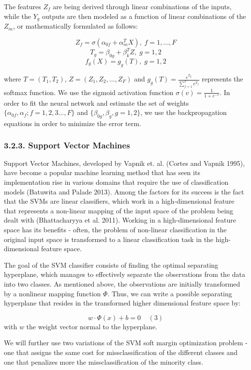 \documentclass[12pt,]{article}
\begin{document}
The features \(Z_f\) are being derived through linear combinations of
the inputs, while the \(Y_g\) outputs are then modeled as a function of
linear combinations of the \(Z_m\), or mathematically formulated as
follows:

\[Z_f=\sigma(\alpha_{0f}+\alpha_{m}^{T}X),\;f=1,...,F\]
\[T_g=\beta_{0g}+\beta_{k}^{T}Z,\;g=1,2\] \[f_{g}(X)=g_g(T),\;g=1,2\]

where \(T=(T_1,T_2)\), \(Z=(Z_1,Z_2,...,Z_F)\) and
\(g_g(T)=\frac{e^{T_g}}{\sum_{f=1}^{F}e^{T_f}}\) represents the softmax
function. We use the sigmoid activation function
\(\sigma(v)=\frac{1}{1+e^{-v}}\). In order to fit the neural network and
estimate the set of weights \(\{\alpha_{0f},\alpha_{f};f=1,2,3...,F\}\)
and \(\{\beta_{0g},\beta_{g},g=1,2\}\), we use the backpropagation
equations in order to minimize the error term.

\hypertarget{support-vector-machines}{%
\subsubsection{3.2.3. Support Vector
Machines}\label{support-vector-machines}}

Support Vector Machines, developed by Vapnik et. al. (Cortes and Vapnik
1995), have become a popular machine learning method that has seen its
implementation rise in various domains that require the use of
classification models (Batuwita and Palade 2013). Among the factors for
its success is the fact that the SVMs are linear classifiers, which work
in a high-dimensional feature that represents a non-linear mapping of
the input space of the problem being dealt with (Bhattacharyya et al.
2011). Working in a high-dimensional feature space has its benefits -
often, the problem of non-linear classification in the original input
space is transformed to a linear classification task in the
high-dimensional feature space.

The goal of the SVM classifier consists of finding the optimal
separating hyperplane, which manages to effectively separate the
observations from the data into two classes. As mentioned above, the
observations are initially transformed by a nonlinear mapping function
\(\Phi\). Thus, we can write a possible separating hyperplane that
resides in the transformed higher dimensional feature space by:

\[w\cdot\Phi(x)+b=0\;\;\;\;(3)\] with \(w\) the weight vector normal to
the hyperplane.

We will further use two variations of the SVM soft margin optimization
problem - one that assigns the same cost for missclassification of the
different classes and one that penalizes more the missclassification of
the minority class.
\end{document}
